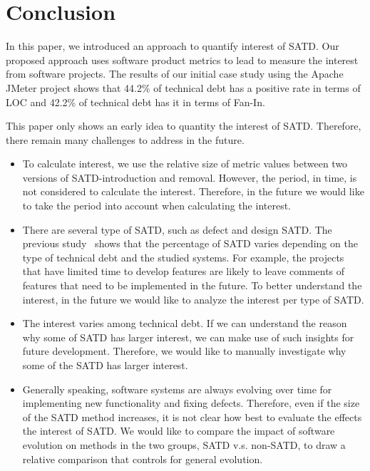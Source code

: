 \section{Conclusion} \label{conclusion}
%
In this paper, we introduced an approach to quantify interest of SATD. Our proposed approach uses
software product metrics to lead to measure the interest from software projects. The results of our initial case study using the Apache JMeter project
shows that 44.2\% of technical debt has a positive rate in terms of LOC and 42.2\% of technical debt has it in terms of Fan-In.

 This paper only shows an early idea to quantity the interest of SATD. Therefore, there remain
many challenges to address in the future. 

\begin{itemize}
\item To calculate interest, we use the relative size of metric values between two versions of SATD-introduction and removal. However, the period, in time, is not considered to calculate the interest. Therefore, in the future we would like to take the period into account when calculating the interest.
\item  There are several type of SATD, such as defect and design SATD.
The previous study~\cite{Maldonado2015MTD} shows that the percentage of SATD varies depending on the type of technical debt and the studied systems. For example, the projects that have limited time to develop features are likely to leave comments of features that need to be implemented in the future. 
To better understand the interest, in the future we would like to analyze the interest per type of SATD.
\item  The interest varies among technical debt. If we can understand the reason why some of SATD has larger interest, we can make use of such insights for future development. Therefore, we would like to manually investigate why some of the SATD has larger interest.
\item Generally speaking, software systems are always evolving over time for implementing new functionality and fixing defects.
Therefore, even if the size of the SATD method increases, it is not clear how best to evaluate the effects the interest of SATD.
We would like to compare the impact of software evolution on methods in the two groups, SATD v.s. non-SATD, to draw a relative comparison that controls for general evolution.
\end{itemize}
